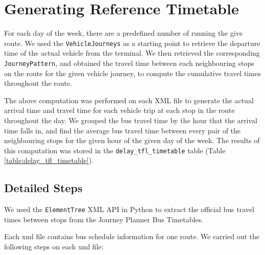 \section{Generating Reference Timetable}
\label{sec: official_tfl_timetable}

For each day of the week, there are a predefined number of running the give route. We used the \texttt{VehicleJourneys} as a starting point to retrieve the departure time of the actual vehicle from the terminal. We then retrieved the corresponding \texttt{JourneyPattern}, and obtained the travel time between each neighbouring stops on the route for the given vehicle journey, to compute the cumulative travel times throughout the route.

The above computation was performed on each XML file to generate the actual arrival time and travel time for each vehicle trip at each stop in the route throughout the day. We grouped the bus travel time by the hour that the arrival time falls in, and find the average bus travel time between every pair of the neighbouring stops for the given hour of the given day of the week. The results of this computation was stored in the \texttt{delay\_tfl\_timetable} table (Table \ref{table:delay_tfl_timetable}).

\subsection{Detailed Steps}

\par We used the \texttt{ElementTree} XML API in Python \cite{elementtree} to extract the official bus travel times between stops from the Journey Planner Bus Timetables\cite{open_data_feeds_description}.

\par Each \acrshort{xml} file contains bus schedule information for one route. We carried out the following steps on each \acrshort{xml} file:


